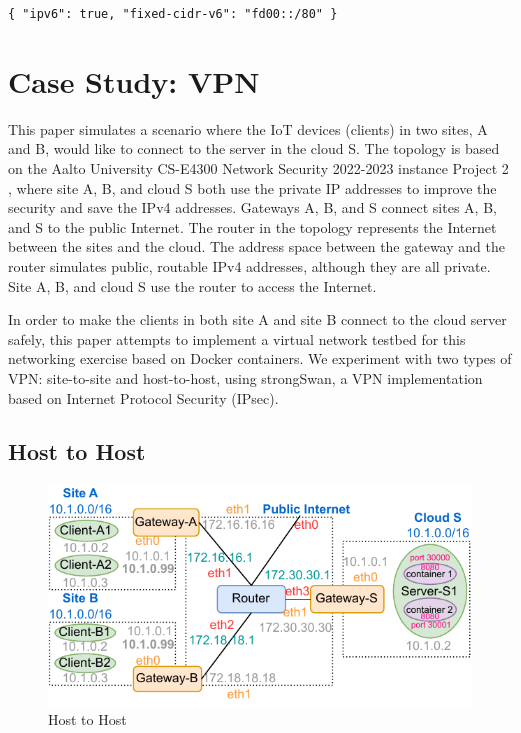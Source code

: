 \documentclass[article]{aaltoseries}
\begin{document}
\texttt{\{
  "ipv6": true,
  "fixed-cidr-v6": "fd00::/80"
\}}



\section{Case Study: VPN}

This paper simulates a scenario where the IoT devices (clients) in two sites, A and B, would like to connect to the server in the cloud S. The topology is based on the Aalto University CS-E4300 Network Security 2022-2023 instance Project 2 \cite{aura_peltonen_bui_2022}, where site A, B, and cloud S both use the private IP addresses to improve the security and save the IPv4 addresses. Gateways A, B, and S connect sites A, B, and S to the public Internet. The router in the topology represents the Internet between the sites and the cloud. The address space between the gateway and the router simulates public, routable IPv4 addresses, although they are all private. Site A, B, and cloud S use the router to access the Internet.

In order to make the clients in both site A and site B connect to the cloud server safely, this paper attempts to implement a virtual network testbed for this networking exercise based on Docker containers. We experiment with two types of VPN: site-to-site and host-to-host, using strongSwan, a VPN implementation based on Internet Protocol Security (IPsec).

\subsection{Host to Host}
\begin{figure}[t!]
  \begin{center}
    \includegraphics[width=1.1\textwidth]{figures/host-to-host.pdf}
    \caption{Host to Host}
    \label{fig:host2host}
  \end{center}
\end{figure}
\end{document}
